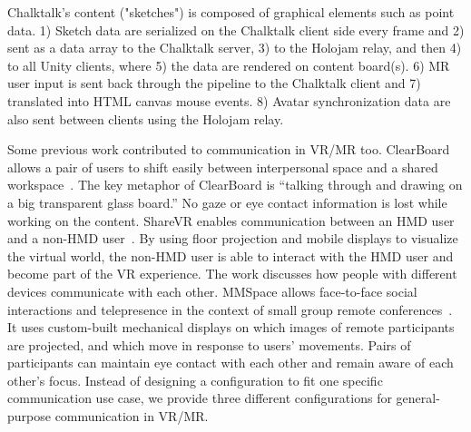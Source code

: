 \documentclass[sigchi-a]{acmart}
\begin{document}
\begin{sidebar}
 
 
 Chalktalk's content ("sketches") is composed of graphical elements such as point data. 1) Sketch data are serialized on the Chalktalk client side every frame and 2) sent as a data array to the Chalktalk server, 3) to the Holojam relay, and then 4) to all Unity clients, where 5) the data are rendered on content board(s). 6) MR user input is sent back through the pipeline to the Chalktalk client and 7) translated into HTML canvas mouse events. 8) Avatar synchronization data are also sent between clients using the Holojam relay.
 
  
\end{sidebar}

Some previous work contributed to communication in VR/MR too. ClearBoard allows a pair of users to shift easily between interpersonal space and a shared workspace~\cite{ishii1993integration}.
The key metaphor of ClearBoard is ``talking through and drawing on a big transparent glass board.'' No gaze or eye contact information is lost while working on the content. ShareVR enables communication between an HMD user and a non-HMD user~\cite{gugenheimer2017sharevr}. By using floor projection and mobile displays to visualize the virtual world, the non-HMD user is able to interact with the HMD user and become part of the VR experience. The work discusses how people with different devices communicate with each other. MMSpace allows face-to-face social interactions and telepresence in the context of small group remote conferences~\cite{otsuka2016mmspace}. It uses custom-built mechanical displays on which images of remote participants are projected, and which move in response to users' movements. Pairs of participants can maintain eye contact with each other and remain aware of each other's focus. Instead of designing a configuration to fit one specific communication use case, we provide three different configurations for general-purpose communication in VR/MR.
\end{document}

